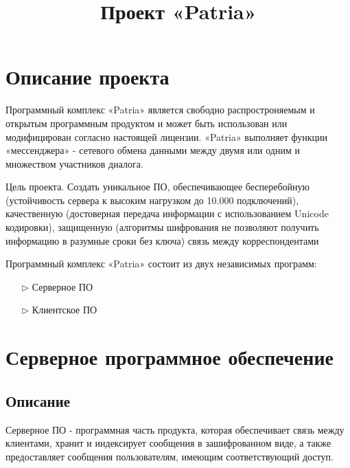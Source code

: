 \documentclass[a4paper,12pt]{article}
\title{Проект «Patria»}
\author{}
\date{}
\begin{document}


\tableofcontents

\maketitle

\section{Описание проекта}
	Программный комплекс «Patria» является свободно распростроняемым и открытым программным продуктом и может быть использован или модифицирован согласно настоящей лицензии. «Patria» выполняет функции «мессенджера» - сетевого обмена данными между двумя или одним и множеством участников диалога.

    Цель проекта. Создать уникальное ПО, обеспечивающее бесперебойную (устойчивость сервера к высоким нагрузком до 10.000 подключений), качественную (достоверная передача информации с использованием Unicode кодировки), защищенную (алгоритмы шифрования не позволяют получить информацию в разумные сроки без ключа) связь между корреспондентами
	
    Программный комплекс «Patria» состоит из двух независимых программ:
\begin{itemize}
    \item [$\triangleright$] Серверное ПО
    \item [$\triangleright$] Клиентское ПО
\end{itemize}

\section{Серверное программное обеспечение}
\subsection{Описание}
	Серверное ПО - программная часть продукта, которая обеспечивает связь между клиентами, хранит и индексирует сообщения в зашифрованном виде, а также предоставляет сообщения пользователям, имеющим соответствующий доступ.
\end{document}
